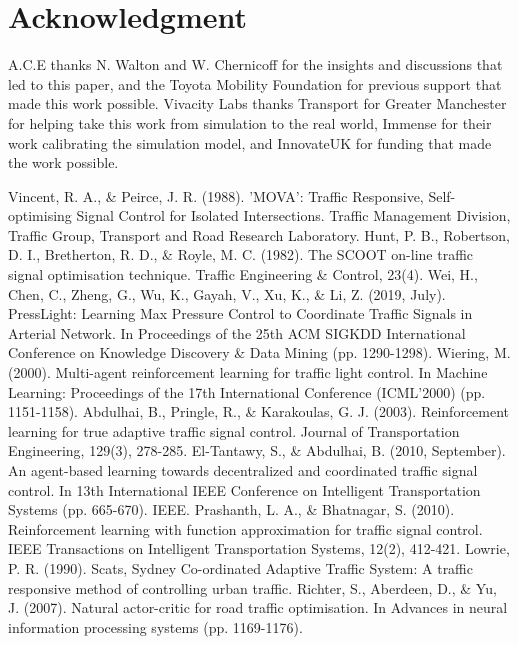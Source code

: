\documentclass{article}
\begin{document}
\section*{Acknowledgment}

A.C.E thanks N. Walton and W. Chernicoff for the insights and discussions that led to this paper, and the Toyota Mobility Foundation for previous support that made this work possible. Vivacity Labs thanks Transport for Greater Manchester for helping take this work from simulation to the real world, Immense for their work calibrating the simulation model, and InnovateUK for funding that made the work possible.


\begin{thebibliography}{00}
 Vincent, R. A., \& Peirce, J. R. (1988). 'MOVA': Traffic Responsive, Self-optimising Signal Control for Isolated Intersections. Traffic Management Division, Traffic Group, Transport and Road Research Laboratory.
 Hunt, P. B., Robertson, D. I., Bretherton, R. D., \& Royle, M. C. (1982). The SCOOT on-line traffic signal optimisation technique. Traffic Engineering \& Control, 23(4).
 Wei, H., Chen, C., Zheng, G., Wu, K., Gayah, V., Xu, K., \& Li, Z. (2019, July). PressLight: Learning Max Pressure Control to Coordinate Traffic Signals in Arterial Network. In Proceedings of the 25th ACM SIGKDD International Conference on Knowledge Discovery \& Data Mining (pp. 1290-1298).
 Wiering, M. (2000). Multi-agent reinforcement learning for traffic light control. In Machine Learning: Proceedings of the 17th International Conference (ICML'2000) (pp. 1151-1158).
 Abdulhai, B., Pringle, R., \& Karakoulas, G. J. (2003). Reinforcement learning for true adaptive traffic signal control. Journal of Transportation Engineering, 129(3), 278-285.
 El-Tantawy, S., \& Abdulhai, B. (2010, September). An agent-based learning towards decentralized and coordinated traffic signal control. In 13th International IEEE Conference on Intelligent Transportation Systems (pp. 665-670). IEEE.
 Prashanth, L. A., \& Bhatnagar, S. (2010). Reinforcement learning with function approximation for traffic signal control. IEEE Transactions on Intelligent Transportation Systems, 12(2), 412-421.
 Lowrie, P. R. (1990). Scats, Sydney Co-ordinated Adaptive Traffic System: A traffic responsive method of controlling urban traffic.
 Richter, S., Aberdeen, D., \& Yu, J. (2007). Natural actor-critic for road traffic optimisation. In Advances in neural information processing systems (pp. 1169-1176).

\end{thebibliography}
\end{document}

